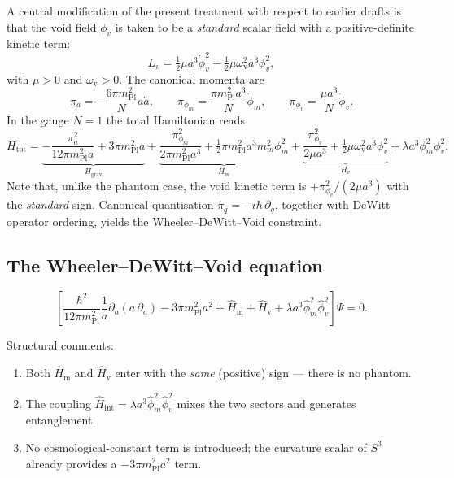 \documentclass[12pt,a4paper]{article}
\theoremstyle{plain}
\theoremstyle{definition}
\newcommand{\Hm}{\hat{H}_{\mathrm{m}}}
\newcommand{\Hv}{\hat{H}_{\mathrm{v}}}
\newcommand{\Hint}{\hat{H}_{\mathrm{int}}}
\newcommand{\Mpl}{m_{\mathrm{Pl}}}
\newcommand{\omv}{\omega_{\mathrm{v}}}
\begin{document}
A central modification of the present treatment with respect to earlier
drafts is that the void field $\phi_v$ is taken to be a \emph{standard}
scalar field with a positive-definite kinetic term:
\begin{equation}
  L_v = \tfrac{1}{2}\mu a^3\dot\phi_v^2
      - \tfrac{1}{2}\mu\omv^2 a^3\phi_v^2,
  \label{eq:Lv}
\end{equation}
with $\mu > 0$ and $\omv > 0$. The canonical momenta are
\begin{equation}
  \pi_a = -\frac{6\pi\Mpl^2}{N}a\dot a,
  \qquad
  \pi_{\phi_m} = \frac{\pi\Mpl^2 a^3}{N}\dot\phi_m,
  \qquad
  \pi_{\phi_v} = \frac{\mu a^3}{N}\dot\phi_v.
  \label{eq:momenta}
\end{equation}
In the gauge $N=1$ the total Hamiltonian reads
\begin{equation}
  H_{\mathrm{tot}} =
  \underbrace{-\frac{\pi_a^2}{12\pi\Mpl^2 a} + 3\pi\Mpl^2 a}_{H_{\mathrm{grav}}}
  + \underbrace{\frac{\pi_{\phi_m}^2}{2\pi\Mpl^2 a^3}
    + \tfrac{1}{2}\pi\Mpl^2 a^3 m_m^2\phi_m^2}_{H_m}
  + \underbrace{\frac{\pi_{\phi_v}^2}{2\mu a^3}
    + \tfrac{1}{2}\mu\omv^2 a^3\phi_v^2}_{H_v}
  + \lambda a^3\phi_m^2\phi_v^2.
  \label{eq:H_total}
\end{equation}
Note that, unlike the phantom case, the void kinetic term is
$+\pi_{\phi_v}^2/(2\mu a^3)$ with the \emph{standard} sign.
Canonical quantisation $\hat\pi_q = -i\hbar\,\partial_q$, together with
DeWitt operator ordering, yields the Wheeler--DeWitt--Void constraint.

\subsection{The Wheeler--DeWitt--Void equation}

\begin{keybox}
\begin{equation}
\left[
  \frac{\hbar^2}{12\pi\Mpl^2}\frac{1}{a}\partial_a(a\,\partial_a)
  - 3\pi\Mpl^2 a^2
  + \Hm + \Hv + \lambda a^3\hat\phi_m^2\hat\phi_v^2
\right]\Psi = 0.
\label{eq:WDWV}
\end{equation}
\end{keybox}

\noindent Structural comments:
\begin{enumerate}[label=(\roman*)]
  \item Both $\Hm$ and $\Hv$ enter with the \emph{same} (positive) sign
        --- there is no phantom.
  \item The coupling $\Hint = \lambda a^3\hat\phi_m^2\hat\phi_v^2$ mixes
        the two sectors and generates entanglement.
  \item No cosmological-constant term is introduced; the curvature scalar
        of $S^3$ already provides a $-3\pi\Mpl^2 a^2$ term.
\end{enumerate}
\end{document}

